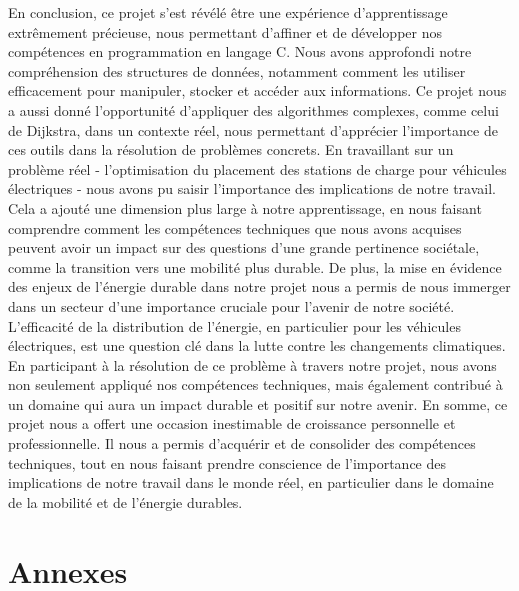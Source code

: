 \documentclass[french,a4paper]{article}
\begin{document}
En conclusion, ce projet s'est révélé être une expérience d'apprentissage extrêmement précieuse, nous permettant d'affiner et de développer nos compétences en programmation en langage C. Nous avons approfondi notre compréhension des structures de données, notamment comment les utiliser efficacement pour manipuler, stocker et accéder aux informations. Ce projet nous a aussi donné l'opportunité d'appliquer des algorithmes complexes, comme celui de Dijkstra, dans un contexte réel, nous permettant d'apprécier l'importance de ces outils dans la résolution de problèmes concrets.
\newline
En travaillant sur un problème réel - l'optimisation du placement des stations de charge pour véhicules électriques - nous avons pu saisir l'importance des implications de notre travail. Cela a ajouté une dimension plus large à notre apprentissage, en nous faisant comprendre comment les compétences techniques que nous avons acquises peuvent avoir un impact sur des questions d'une grande pertinence sociétale, comme la transition vers une mobilité plus durable.
\newline
De plus, la mise en évidence des enjeux de l'énergie durable dans notre projet nous a permis de nous immerger dans un secteur d'une importance cruciale pour l'avenir de notre société. L'efficacité de la distribution de l'énergie, en particulier pour les véhicules électriques, est une question clé dans la lutte contre les changements climatiques. En participant à la résolution de ce problème à travers notre projet, nous avons non seulement appliqué nos compétences techniques, mais également contribué à un domaine qui aura un impact durable et positif sur notre avenir.
\newline
En somme, ce projet nous a offert une occasion inestimable de croissance personnelle et professionnelle. Il nous a permis d'acquérir et de consolider des compétences techniques, tout en nous faisant prendre conscience de l'importance des implications de notre travail dans le monde réel, en particulier dans le domaine de la mobilité et de l'énergie durables.

\section{Annexes}





\end{document}
